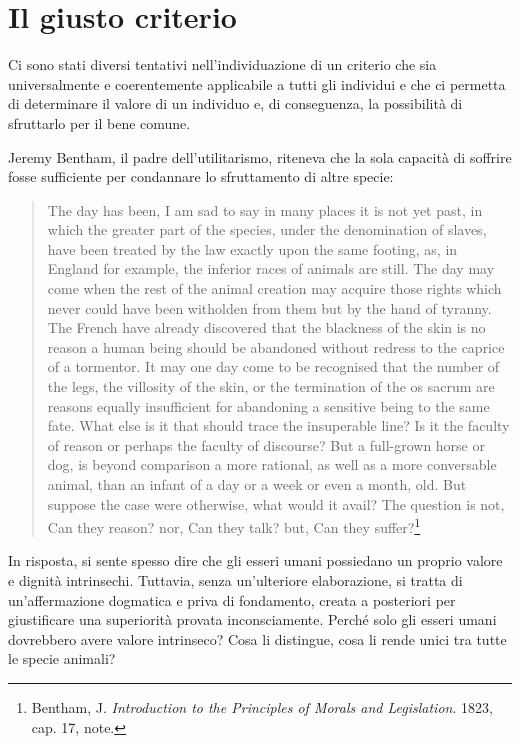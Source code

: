 \documentclass[a4paper,11pt,oneside,article]{memoir}
\begin{document}
\chapter{Il giusto criterio}

Ci sono stati diversi tentativi nell'individuazione di un criterio che sia
universalmente e coerentemente applicabile a tutti gli individui e che ci
permetta di determinare il valore di un individuo e, di conseguenza, la
possibilità di sfruttarlo per il bene comune.

Jeremy Bentham, il padre dell'utilitarismo, riteneva che la sola capacità di
soffrire fosse sufficiente per condannare lo sfruttamento di altre specie:

\begin{quotation}

The day has been, I am sad to say in many places it is not yet past, in which
the greater part of the species, under the denomination of slaves, have been
treated by the law exactly upon the same footing, as, in England for example,
the inferior races of animals are still. The day may come when the rest of the
animal creation may acquire those rights which never could have been witholden
from them but by the hand of tyranny. The French have already discovered that
the blackness of the skin is no reason a human being should be abandoned without
redress to the caprice of a tormentor. It may one day come to be recognised that
the number of the legs, the villosity of the skin, or the termination of the os
sacrum are reasons equally insufficient for abandoning a sensitive being to the
same fate. What else is it that should trace the insuperable line? Is it the
faculty of reason or perhaps the faculty of discourse? But a full-grown horse or
dog, is beyond comparison a more rational, as well as a more conversable animal,
than an infant of a day or a week or even a month, old. But suppose the case
were otherwise, what would it avail? The question is not, Can they reason? nor,
Can they talk? but, Can they suffer?\footnote{Bentham, J. \emph{Introduction to
the Principles of Morals and Legislation}. 1823, cap. 17, note.}

\end{quotation}

In risposta, si sente spesso dire che gli esseri umani possiedano un proprio
valore e dignità intrinsechi. Tuttavia, senza un'ulteriore elaborazione, si
tratta di un'affermazione dogmatica e priva di fondamento, creata a posteriori
per giustificare una superiorità provata inconsciamente. Perché solo gli esseri
umani dovrebbero avere valore intrinseco? Cosa li distingue, cosa li rende unici
tra tutte le specie animali?
\end{document}
